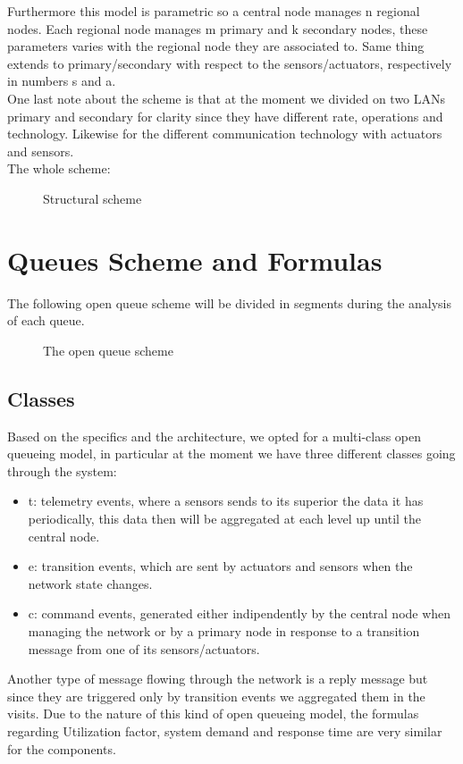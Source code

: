 \documentclass[11pt]{article}
\begin{document}
Furthermore this model is parametric so a central node manages n regional nodes. Each regional node manages m primary and k secondary nodes, these parameters varies with the regional node they are associated to. Same thing extends to primary/secondary with respect to the sensors/actuators, respectively in numbers s and a.\\
One last note about the scheme is that at the moment we divided on two LANs primary and secondary for clarity since they have different rate, operations and technology. Likewise for the different communication technology with actuators and sensors.\\
The whole scheme:
\begin{figure}[H]
	\hspace*{-3.75cm}
	\frame{}
  \caption{Structural scheme}
\end{figure}

\section{Queues Scheme and Formulas}
The following open queue scheme will be divided in segments during the analysis of each queue.
\begin{figure}[H]
	\vspace*{-0.5cm}
	\hspace*{-3.5cm}
	\centering
	\frame{}
	\caption{The open queue scheme}
\end{figure}
\subsection{Classes}
Based on the specifics and the architecture, we opted for a multi-class open queueing model, in particular at the moment we have three different classes going through the system:
\begin{itemize}
\item t: telemetry events, where a sensors sends to its superior the data it has periodically, this data then will be aggregated at each level up until the central node.
\item e: transition events, which are sent by actuators and sensors when the network state changes.
\item c: command events, generated either indipendently by the central node when managing the network or by a primary node in response to a transition message from one of its sensors/actuators.
\end{itemize}
Another type of message flowing through the network is a reply message but since they are triggered only by transition events we aggregated them in the visits.
Due to the nature of this kind of open queueing model, the formulas regarding Utilization factor, system demand and response time are very similar for the components.
\end{document}
